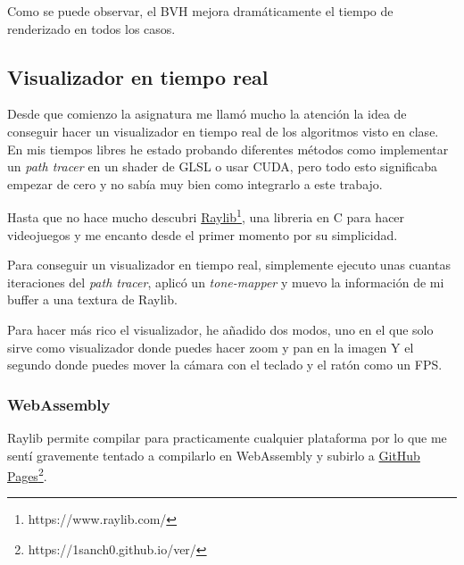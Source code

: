 \documentclass{article}
\begin{document}
Como se puede observar, el BVH mejora dramáticamente el tiempo de renderizado en
todos los casos.

\subsection{Visualizador en tiempo real}
Desde que comienzo la asignatura me llamó mucho la atención la idea de conseguir
hacer un visualizador en tiempo real de los algoritmos visto en clase. En mis
tiempos libres he estado probando diferentes métodos como implementar un
\textit{path tracer} en un shader de GLSL o usar CUDA, pero todo esto
significaba empezar de cero y no sabía muy bien como integrarlo a este trabajo.

Hasta que no hace mucho descubri
\href{https://www.raylib.com/}{Raylib}\footnote{https://www.raylib.com/}, una
libreria en C para hacer videojuegos y me encanto desde el primer momento por su
simplicidad.

Para conseguir un visualizador en tiempo real, simplemente ejecuto unas cuantas
iteraciones del \textit{path tracer}, aplicó un \textit{tone-mapper} y muevo la
información de mi buffer a una textura de Raylib.

Para hacer más rico el visualizador, he añadido dos modos, uno en el que solo
sirve como visualizador donde puedes hacer zoom y pan en la imagen Y el segundo
donde puedes mover la cámara con el teclado y el ratón como un FPS.

\subsubsection{WebAssembly}
Raylib permite compilar para practicamente cualquier plataforma por lo que me
sentí gravemente tentado a compilarlo en WebAssembly y subirlo a
\href{https://1sanch0.github.io/ver/}{GitHub
  Pages}\footnote{https://1sanch0.github.io/ver/}.
\end{document}
